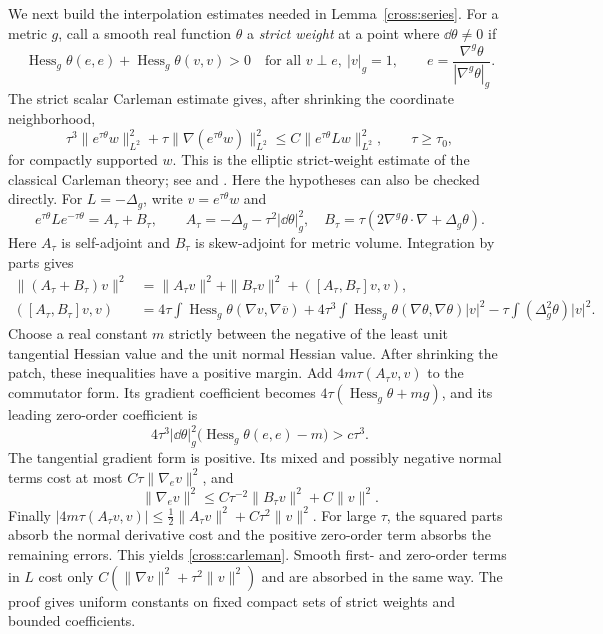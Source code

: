 We next build the interpolation estimates needed in
Lemma~\ref{cross:series}.  For a metric $g$, call a smooth real function
$\theta$ a \emph{strict weight} at a point where $\dd\theta\ne0$ if
\begin{equation}\label{cross:strict-weight}
 \operatorname{Hess}_g\theta(e,e)
  +\operatorname{Hess}_g\theta(v,v)>0
 \quad\text{for all }v\perp e,\ |v|_g=1,
 \qquad e=\frac{\nabla^g\theta}{|\nabla^g\theta|_g}.
\end{equation}
The strict scalar Carleman estimate gives, after shrinking the
coordinate neighborhood,
\begin{equation}\label{cross:carleman}
 \tau^3\|e^{\tau\theta}w\|_{L^2}^2
 +\tau\|\nabla(e^{\tau\theta}w)\|_{L^2}^2
 \le C\|e^{\tau\theta}Lw\|_{L^2}^2,
 \qquad \tau\ge\tau_0,
\end{equation}
for compactly supported $w$.
This is the elliptic strict-weight estimate of the classical
Carleman theory; see \citet[Chapter~XXVIII]{HormanderIV2009} and
\citet[Definition~8.3 and Theorem~9(a)]{KochTataru2005}.
Here the hypotheses can also be checked directly.  For $L=-\Delta_g$,
write $v=e^{\tau\theta}w$ and
\[
 e^{\tau\theta}Le^{-\tau\theta}=A_\tau+B_\tau,\qquad
 A_\tau=-\Delta_g-\tau^2|\dd\theta|_g^2,\quad
 B_\tau=\tau(2\nabla^g\theta\cdot\nabla+\Delta_g\theta).
\]
Here $A_\tau$ is self-adjoint and $B_\tau$ is skew-adjoint for
metric volume.  Integration by parts gives
\begin{align*}
 \|(A_\tau+B_\tau)v\|^2
 &=\|A_\tau v\|^2+\|B_\tau v\|^2
       +([A_\tau,B_\tau]v,v),\\
 ([A_\tau,B_\tau]v,v)
 &=4\tau\int\operatorname{Hess}_g\theta(\nabla v,\nabla\overline v)
   +4\tau^3\int\operatorname{Hess}_g\theta
                 (\nabla\theta,\nabla\theta)|v|^2
   -\tau\int(\Delta_g^2\theta)|v|^2.
\end{align*}
Choose a real constant $m$ strictly between the negative of the least
unit tangential Hessian value and the unit normal Hessian value.
After shrinking the patch, these inequalities have a positive margin.
Add $4m\tau(A_\tau v,v)$ to the commutator form.  Its gradient
coefficient becomes $4\tau(\operatorname{Hess}_g\theta+mg)$,
and its leading zero-order coefficient is
\[
 4\tau^3|\dd\theta|_g^2
       \big(\operatorname{Hess}_g\theta(e,e)-m\big)>c\tau^3.
\]
The tangential gradient form is positive.  Its mixed and possibly
negative normal terms cost at most
$C\tau\|\nabla_e v\|^2$, and
\[
 \|\nabla_e v\|^2
 \le C\tau^{-2}\|B_\tau v\|^2+C\|v\|^2.
\]
Finally
$|4m\tau(A_\tau v,v)|\le\tfrac12\|A_\tau v\|^2+
C\tau^2\|v\|^2$.
For large $\tau$, the squared parts absorb the normal derivative
cost and the positive zero-order term absorbs the remaining errors.
This yields \eqref{cross:carleman}.  Smooth first- and zero-order terms
in $L$ cost only $C(\|\nabla v\|^2+\tau^2\|v\|^2)$ and are absorbed
in the same way.  The proof gives uniform constants on fixed compact
sets of strict weights and bounded coefficients.


